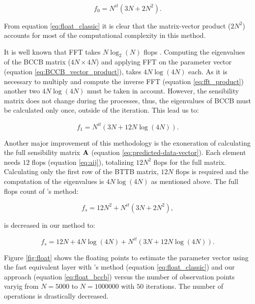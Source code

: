 \documentclass[paper]{geophysics}
\begin{document}
\begin{equation}
f_0 = N^{it} (3N + 2N^2).
\label{eq:float_classic}
\end{equation}

From equation \ref{eq:float_classic} it is clear that the matrix-vector product ($2N^2$) accounts for most of the computational complexity in this method.

It is well known that FFT takes $N \log_2(N)$ flops \cite[]{brigham1988fast}. Computing the eigenvalues of the BCCB matrix ($4N \times 4N$) and applying FFT on the parameter vector (equation \ref{eq:BCCB_vector_product}), takes $4N \log(4N)$ each. As it is necessary to multiply and compute the inverse FFT (equation \ref{eq:fft_product}) another two $4N \log(4N)$ must be taken in account. However, the sensibility matrix does not change during the processes, thus, the eigenvalues of BCCB must be calculated only once, outside of the iteration. This lead us to:

\begin{equation}
f_1 = N^{it} (3N + 12N\log(4N)).
\label{eq:float_bccb}
\end{equation}

Another major improvement of this methodology is the exoneration of calculating the full sensibility matrix $\tensor{A}$ (equation \ref{eq:predicted-data-vector}). Each element needs $12$ flops (equation \ref{eq:aij}), totalizing $12N^2$ flops for the full matrix. Calculating only the first row of the BTTB matrix, $12N$ flops is required and the computation of the eigenvalues is $4N \log(4N)$ as mentioned above.
The full flops count of \cite{siqueira2017fast}'s method:

\begin{equation}
f_s = 12N^2 + N^{it} (3N + 2N^2),
\label{eq:float_siqueira}
\end{equation}

is decreased in our method to:

\begin{equation}
f_s = 12N + 4N \log(4N) + N^{it} (3N + 12N\log(4N)).
\label{eq:float_new}
\end{equation}

Figure \ref{fig:float} shows the floating points to estimate the parameter vector using the fast equivalent layer with \cite{siqueira2017fast}'s method (equation \ref{eq:float_classic}) and our approach (equation \ref{eq:float_bccb}) versus the number of observation points varyig from $N = 5000$ to $N = 1000000$ with $50$ iterations. The number of operations is drastically decreased.
\end{document}

